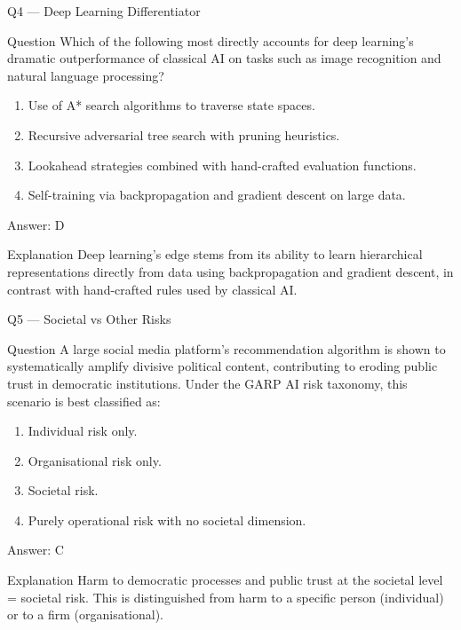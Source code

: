 \documentclass[aspectratio=169,8pt]{beamer}
\begin{document}
	\begin{frame}{Q4 --- Deep Learning Differentiator}
		\begin{block}{Question}
			Which of the following most directly accounts for deep learning's dramatic outperformance of classical AI on tasks such as image recognition and natural language processing?
		\end{block}
		\begin{enumerate}
			\item Use of A* search algorithms to traverse state spaces.
			\item Recursive adversarial tree search with pruning heuristics.
			\item Lookahead strategies combined with hand-crafted evaluation functions.
			\item Self-training via backpropagation and gradient descent on large data.
		\end{enumerate}
		\begin{exampleblock}{Answer: D}\end{exampleblock}
		\begin{block}{Explanation}
			Deep learning's edge stems from its ability to learn hierarchical representations directly from data using backpropagation and gradient descent, in contrast with hand-crafted rules used by classical AI.
		\end{block}
	\end{frame}
	
	\begin{frame}{Q5 --- Societal vs Other Risks}
		\begin{block}{Question}
			A large social media platform's recommendation algorithm is shown to systematically amplify divisive political content, contributing to eroding public trust in democratic institutions. Under the GARP AI risk taxonomy, this scenario is best classified as:
		\end{block}
		\begin{enumerate}
			\item Individual risk only.
			\item Organisational risk only.
			\item Societal risk.
			\item Purely operational risk with no societal dimension.
		\end{enumerate}
		\begin{exampleblock}{Answer: C}\end{exampleblock}
		\begin{block}{Explanation}
			Harm to democratic processes and public trust at the societal level = societal risk. This is distinguished from harm to a specific person (individual) or to a firm (organisational).
		\end{block}
	\end{frame}
	
\end{document}
